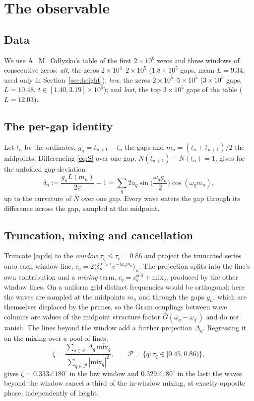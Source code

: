\documentclass[12pt]{amsart}
\begin{document}
\section{The observable}\label{sec:obs}

\subsection*{Data} We use A.~M.~Odlyzko's table of the first
$2\times10^6$ zeros \cite{OdlyzkoTables,Odl87} and three windows of consecutive zeros:
\emph{alt}, the zeros $2\times10^4$--$2\times10^5$ ($1.8\times10^5$ gaps,
mean $L = 9.34$; used only in Section~\ref{sec:height}); \emph{low}, the zeros $2\times10^5$--$5\times10^5$
($3\times10^5$ gaps, $L = 10.48$, $t \in [1.40, 3.19]\times10^5$); and
\emph{last}, the top $3\times10^5$ gaps of the table ($L = 12.03$).

\subsection*{The per-gap identity}
Let $t_n$ be the ordinates, $g_n = t_{n+1} - t_n$ the gaps and
$m_n = (t_n + t_{n+1})/2$ the midpoints. Differencing \eqref{eq:S} over
one gap, $N(t_{n+1}) - N(t_n) = 1$, gives for the unfolded gap deviation
\begin{equation}\label{eq:ds}
\delta_n := \frac{g_n L(m_n)}{2\pi} - 1
= \sum_q 2a_q \sin\!\Big(\frac{\omega_q g_n}{2}\Big)\cos(\omega_q m_n),
\end{equation}
up to the curvature of $\bar N$ over one gap. Every wave enters the gap
through its difference across the gap, sampled at the midpoint.

\subsection*{Truncation, mixing and cancellation}
Truncate \eqref{eq:ds} to the \emph{window} $\tau_q \le \tau_c = 0.86$
and project the truncated series onto each window line,
$c_q = 2\langle \delta^{(\tau_c)}_n e^{-i\omega_q m_n}\rangle_n$. The
projection splits into the line's own contribution and a \emph{mixing}
term, $c_q = c_q^{\mathrm{self}} + \mathrm{mix}_q$, produced by the other
window lines. On a uniform grid distinct frequencies would be orthogonal;
here the waves are sampled at the midpoints $m_n$ and through the gaps
$g_n$, which are themselves displaced by the primes, so the Gram couplings
between wave columns are values of the midpoint structure factor
$\hat G(\omega_q - \omega_{q'})$ \cite{companion4} and do not vanish. The
lines beyond the window add a further projection $\Delta_q$. Regressing
it on the mixing over a pool of lines,
\begin{equation}\label{eq:zeta}
\zeta = \frac{\sum_{q\in\mathcal P} \Delta_q\,\overline{\mathrm{mix}_q}}
{\sum_{q\in\mathcal P}|\mathrm{mix}_q|^2},
\qquad \mathcal P = \{q: \tau_q \in [0.45, 0.86)\},
\end{equation}
gives $\zeta = 0.333\angle180^\circ$ in the low window and
$0.329\angle180^\circ$ in the last: the waves beyond the window cancel a
third of the in-window mixing, at exactly opposite phase, independently
of height.
\end{document}
